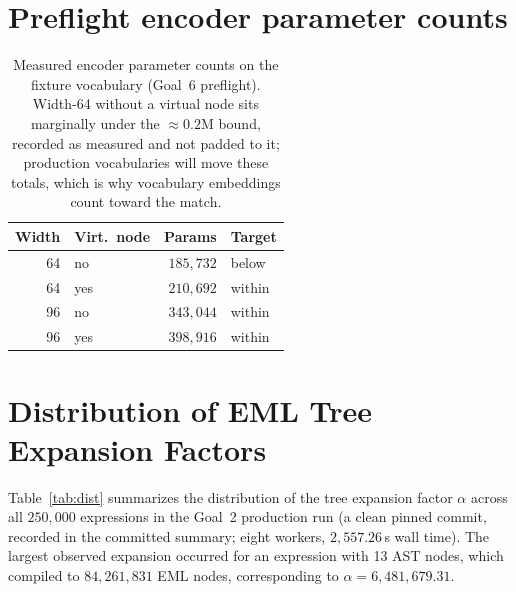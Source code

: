 \documentclass[11pt]{article}
\begin{document}



\appendix

\section{Preflight encoder parameter counts}
\label{app:params}

\begin{table}[h]
\centering
\small
\renewcommand{\arraystretch}{1.1}
\begin{tabular}{@{}rlrl@{}}
\toprule
\textbf{Width} & \textbf{Virt.\ node} & \textbf{Params} & \textbf{Target} \\
\midrule
64 & no  & $185{,}732$ & below \\
64 & yes & $210{,}692$ & within \\
96 & no  & $343{,}044$ & within \\
96 & yes & $398{,}916$ & within \\
\bottomrule
\end{tabular}
\caption{Measured encoder parameter counts on the fixture vocabulary (Goal~6
preflight). Width-64 without a virtual node sits marginally under the
$\approx\!0.2$M bound, recorded as measured and not padded to it; production
vocabularies will move these totals, which is why vocabulary embeddings count
toward the match.}
\label{tab:params}
\end{table}

\section{Distribution of EML Tree Expansion Factors}
\label{app:dist}
Table~\ref{tab:dist} summarizes the distribution of the tree expansion factor $\alpha$ across all $250{,}000$ expressions in the Goal~2 production run (a clean pinned commit, recorded in the committed summary; eight workers, $2{,}557.26$\,s wall time). The largest observed expansion occurred for an expression with 13 AST nodes, which compiled to $84{,}261{,}831$ EML nodes, corresponding to $\alpha = 6{,}481{,}679.31$.
\end{document}
